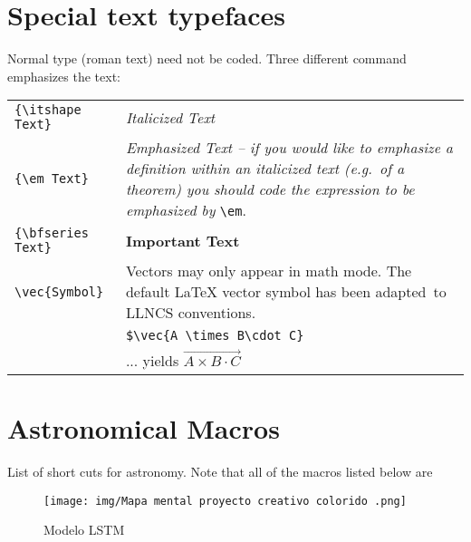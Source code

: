 \documentclass[usenatbib]{tjaa}
\begin{document}
\section{Special text typefaces}

Normal type (roman text) need not be coded. Three different command
emphasizes the text:
\begin{flushleft}
\begin{tabular}{@{}p{}p{}}
\verb|{\itshape Text}|   & {\itshape Italicized Text}\\
\verb|{\em Text}|   & {\em Emphasized Text --
   if you would like to emphasize a {\em definition} within an
   italicized text (e.g.\ of a {\em theorem}) you should code the
   expression to be emphasized by} \verb|\em|.\\
\verb|{\bfseries Text}|& {\bfseries Important Text}\\
\verb|\vec{Symbol}| & Vectors may only appear in math mode. The default
   \LaTeX{} vector symbol has been adapted\footnotemark\
   to LLNCS conventions.\\[2pt]
 & \verb|$\vec{A \times B\cdot C}|\\
 & ... yields $\vec{A\times B\cdot C}$
\end{tabular}
\end{flushleft}

\section{Astronomical Macros}

List of short cuts for astronomy. Note that all of the macros listed below are

\begin{figure}
\texttt{[image: img/Mapa mental proyecto creativo colorido .png]}
\caption{Modelo LSTM}
\label{lstm}
\end{figure}
\end{document}
